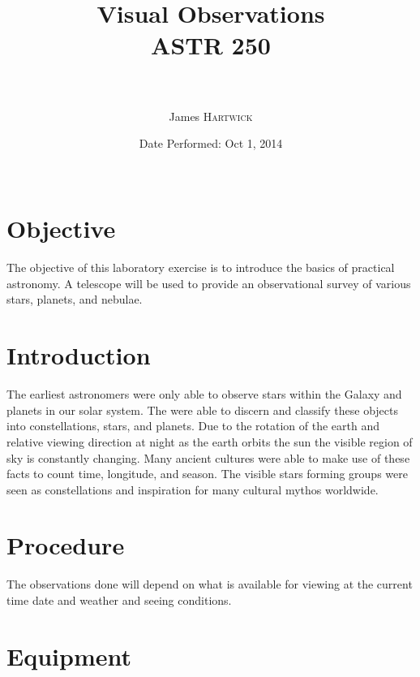 \documentclass{article}
\title{Visual Observations \\ ASTR 250\\ \ \\ } %
\author{James \textsc{Hartwick}} %
\date{Date Performed: Oct 1, 2014\\ \ } %
\begin{document}
\maketitle %


\section{Objective}
The objective of this laboratory exercise is to introduce the basics of practical astronomy. A telescope will be used to provide an observational survey of various stars, planets, and nebulae.
\section{Introduction}
The earliest astronomers were only able to observe stars within the Galaxy and planets in our solar system. The were able to discern and classify these objects into constellations, stars, and planets. Due to the rotation of the earth and relative viewing direction at night as the earth orbits the sun the visible region of sky is constantly changing. Many ancient cultures were able to make use of these facts to count time, longitude, and season. The visible stars forming groups were seen as constellations and inspiration for many cultural mythos worldwide.
\section{Procedure}
The observations done will depend on what is available for viewing at the current time date and weather and seeing conditions.
\section{Equipment}
\end{document}
